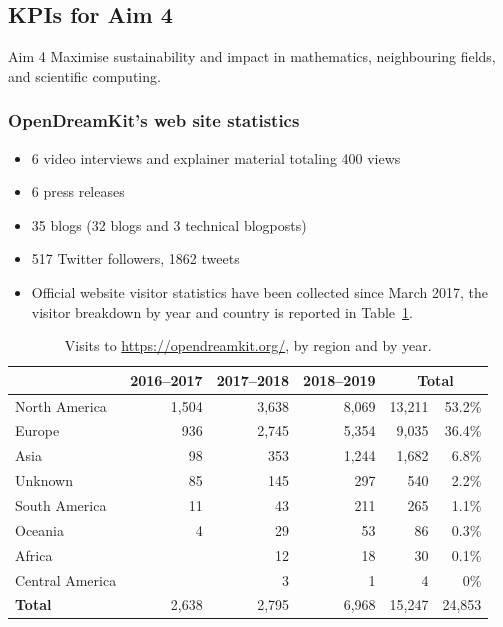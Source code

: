 \subsection{KPIs for Aim 4}

\begin{recommendation}{Aim 4}
  Maximise sustainability and impact in mathematics, neighbouring
  fields, and scientific computing.
\end{recommendation}

\subsubsection{OpenDreamKit's web site statistics}

\begin{itemize}
\item 6 video interviews and explainer material totaling 400 views
\item 6 press releases
\item 35 blogs (32 blogs and 3 technical blogposts)
\item 517 Twitter followers, 1862 tweets
\item Official website visitor statistics have been collected since
  March 2017, the visitor breakdown by year and country is reported in
  Table~\ref{tab:byregion}.
\end{itemize}

\begin{table}
  \centering
  \begin{tabular}{l r r r r r}
    & {\bf 2016--2017} & {\bf 2017--2018} & {\bf 2018--2019} & \multicolumn{2}{c}{\bf Total}\\
    \hline
    North America   & 1,504 & 3,638 & 8,069 & 13,211 & 53.2\%\\
    Europe          &   936 & 2,745 & 5,354 &  9,035 & 36.4\%\\
    Asia            &    98 &   353 & 1,244 &  1,682 &  6.8\%\\
    Unknown         &    85 &   145 &   297 &    540 &  2.2\%\\
    South America   &    11 &    43 &   211 &    265 &  1.1\%\\
    Oceania         &     4 &    29 &    53 &     86 &  0.3\%\\
    Africa          &       &    12 &    18 &     30 &  0.1\%\\
    Central America &       &     3 &     1 &      4 &  0\%\\
    \hline
    {\bf Total}  & 2,638 & 2,795 & 6,968 & 15,247 & 24,853
  \end{tabular}
  \caption{Visits to \url{https://opendreamkit.org/}, by region and by year.}
  \label{tab:byregion}
\end{table}

